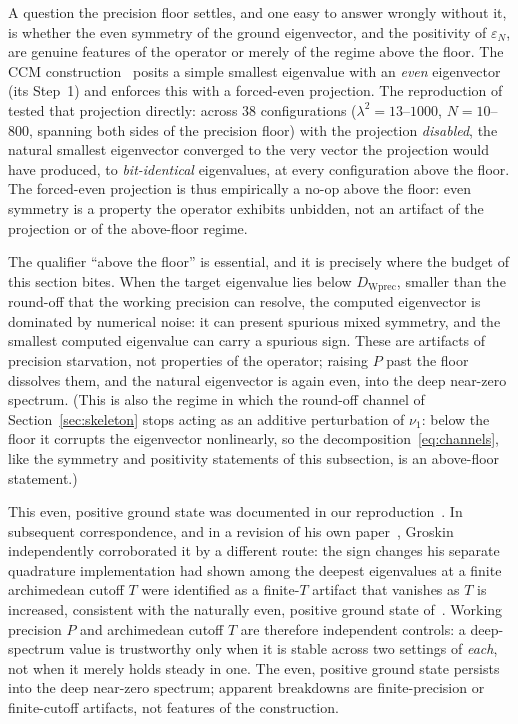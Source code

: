 \documentclass[11pt,a4paper]{article}
\begin{document}
A question the precision floor settles, and one easy to answer wrongly
without it, is whether the even symmetry of the ground eigenvector, and the
positivity of $\varepsilon_N$, are genuine features of the operator or merely of
the regime above the floor. The CCM construction~\cite{CCM2025} posits a simple
smallest eigenvalue with an \emph{even} eigenvector (its Step~1) and enforces
this with a forced-even projection. The reproduction of~\cite{AndrewsA} tested
that projection directly: across $38$ configurations ($\lambda^2=13$--$1000$,
$N=10$--$800$, spanning both sides of the precision floor) with the projection
\emph{disabled}, the natural smallest eigenvector converged to the very vector
the projection would have produced, to \emph{bit-identical} eigenvalues,
at every configuration above the floor. The forced-even projection is thus
empirically a no-op above the floor: even symmetry is a property the operator
exhibits unbidden, not an artifact of the projection or of the above-floor
regime.

The qualifier ``above the floor'' is essential, and it is precisely where the
budget of this section bites. When the target eigenvalue lies below
$D_{\mathrm{Wprec}}$, smaller than the round-off that the working precision
can resolve, the computed eigenvector is dominated by numerical noise: it can
present spurious mixed symmetry, and the smallest computed eigenvalue can carry
a spurious sign. These are artifacts of precision starvation, not properties of
the operator; raising $P$ past the floor dissolves them, and the natural
eigenvector is again even, into the deep near-zero spectrum. (This is also the
regime in which the round-off channel of Section~\ref{sec:skeleton} stops
acting as an additive perturbation of $\nu_1$: below the floor it corrupts the
eigenvector nonlinearly, so the decomposition~\eqref{eq:channels}, like the
symmetry and positivity statements of this subsection, is an above-floor
statement.)

This even, positive ground state was documented in our reproduction~\cite{AndrewsA}.
In subsequent correspondence, and in a revision of his own paper~\cite{Groskin2026},
Groskin independently corroborated it by a different route: the sign changes his
separate quadrature implementation had shown among the deepest eigenvalues at a
finite archimedean cutoff $T$ were identified as a finite-$T$ artifact that
vanishes as $T$ is increased, consistent with the naturally even, positive ground
state of~\cite{AndrewsA}. Working precision $P$ and archimedean cutoff $T$ are
therefore independent controls: a deep-spectrum value is trustworthy only when it
is stable across two settings of \emph{each}, not when it merely holds steady in
one. The even, positive ground state persists into the deep near-zero spectrum;
apparent breakdowns are finite-precision or finite-cutoff artifacts, not features
of the construction.
\end{document}
